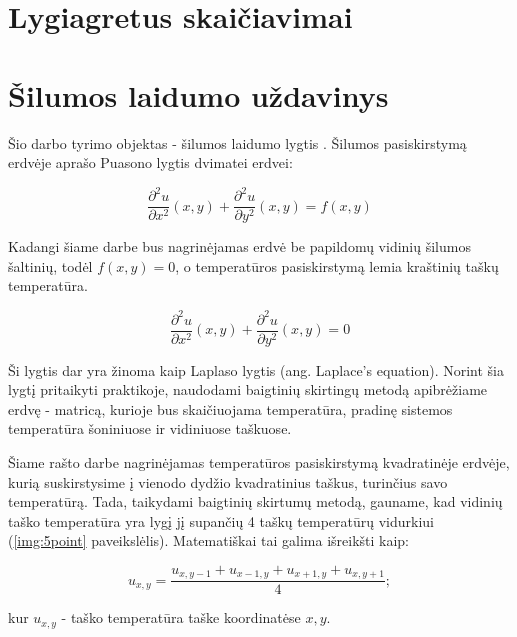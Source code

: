 \documentclass{VUMIFPSbakalaurinis}
\begin{document}
\section{Lygiagretus skaičiavimai}



\section{Šilumos laidumo uždavinys}



Šio darbo tyrimo objektas - šilumos laidumo lygtis \cite{burden2011numerical}. 
Šilumos pasiskirstymą erdvėje aprašo Puasono lygtis dvimatei erdvei:

\[ \frac{∂^2 u}{∂ x^2}(x,y)+\frac{∂^2 u}{∂ y^2}(x,y) = f(x,y) \]

Kadangi šiame darbe bus nagrinėjamas erdvė be papildomų vidinių šilumos šaltinių, todėl $f(x,y) = 0 $, o temperatūros pasiskirstymą lemia kraštinių taškų temperatūra.

\[ \frac{∂^2 u}{∂ x^2}(x,y)+\frac{∂^2 u}{∂ y^2}(x,y) = 0 \]

Ši lygtis dar yra žinoma kaip Laplaso lygtis (ang. Laplace's equation).
Norint šia lygtį pritaikyti praktikoje, naudodami baigtinių skirtingų metodą apibrėžiame erdvę - matricą, kurioje bus skaičiuojama temperatūra, pradinę sistemos temperatūra šoniniuose ir vidiniuose taškuose.

Šiame rašto darbe nagrinėjamas temperatūros pasiskirstymą kvadratinėje erdvėje, kurią suskirstysime į vienodo dydžio kvadratinius taškus, turinčius savo temperatūrą.
Tada, taikydami baigtinių skirtumų metodą, gauname, kad vidinių taško temperatūra yra lygį jį supančių 4 taškų temperatūrų vidurkiui (\ref{img:5point} paveikslėlis). 
Matematiškai tai galima išreikšti kaip:

\[ u_{x, y} = \frac{u_{x,y-1}+u_{x-1,y}+u_{x+1,y}+u_{x,y+1}}{4} ;\]

kur $u_{x,y}$ - taško temperatūra taške koordinatėse $x,y$.  
\end{document}
